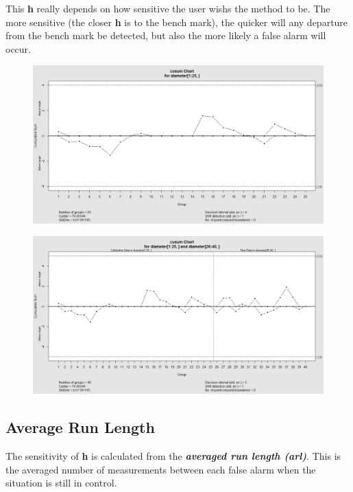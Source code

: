 \documentclass[SPC-MASTER.tex]{subfiles}
\begin{document}
This \textbf{h} really depends on how sensitive the user wishs the method to be. The more sensitive (the closer \textbf{h} is to the bench mark), the quicker will any departure from the bench mark be detected, but also the more likely a false alarm will occur.
\newpage
\begin{figure}[h!]
\centering
\includegraphics[width=0.9\linewidth]{images/CUSUMorings1}
\caption{}
\label{fig:cusumorings1}
\end{figure}
\begin{figure}[h!]
\centering
\includegraphics[width=0.9\linewidth]{images/CUSUMorings2}
\caption{}
\label{fig:cusumorings2}
\end{figure}

\newpage

\subsection{Average Run Length}
The sensitivity of \textbf{h} is calculated from the \textit{\textbf{averaged run length (arl)}}. This is the averaged number of measurements between each false alarm when the situation is still in control.
\end{document}
